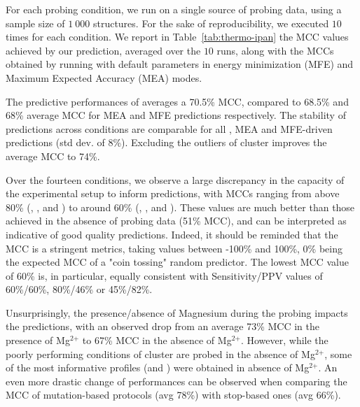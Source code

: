 \documentclass[a4,center,fleqn]{NAR}
\begin{document}
For each probing condition, we run \OurTool{} on a single source of probing data, using a sample size of $1~000$ structures. For the sake of reproducibility, we executed \OurTool{} $10$ times for each condition. We report in Table~\ref{tab:thermo-ipan} the MCC values achieved by our prediction, averaged over the $10$ runs, along with the MCCs obtained by running  with default parameters in energy minimization (MFE) and Maximum Expected Accuracy (MEA) modes.


The predictive performances of \OurTool averages a 70.5\% MCC, compared to 68.5\% and 68\% average MCC for MEA and MFE predictions respectively. The stability of predictions across conditions are comparable for all \OurTool, MEA and MFE-driven predictions (std dev. of 8\%). Excluding the outliers of cluster  improves the average MCC to 74\%.

Over the fourteen conditions, we observe a large discrepancy in the capacity of the experimental setup to inform predictions, with MCCs ranging from above 80\% (\NMIA, \NMIAMg, \OneMSevILU and \OneMSevILUMg) to around 60\% (\NAICE, \BzCN, \OneMSevCE and \NMIACE). These values are much better than those achieved in the absence of probing data (51\% MCC), and can be interpreted as indicative of good quality predictions. Indeed, it should be reminded that the MCC is a stringent metrics, taking values between -100\% and 100\%, 0\% being the expected MCC of a "coin tossing" random predictor. The lowest MCC value of 60\% is, in particular, equally consistent with Sensitivity/PPV values of 60\%/60\%, 80\%/46\% or 45\%/82\%.

Unsurprisingly, the presence/absence of Magnesium during the probing impacts the predictions, with an observed drop from an average 73\% MCC in the presence of Mg$^\text{2+}$ to 67\% MCC in the absence of Mg$^\text{2+}$. However, while the poorly performing conditions of cluster  are probed in the absence of Mg$^\text{2+}$, some of the most informative profiles (\OneMSevILU and \NMIA) were obtained in absence of Mg$^\text{2+}$.
An even more drastic change of performances can be observed when comparing the MCC of mutation-based protocols (avg 78\%) with stop-based ones (avg 66\%). 
\end{document}
